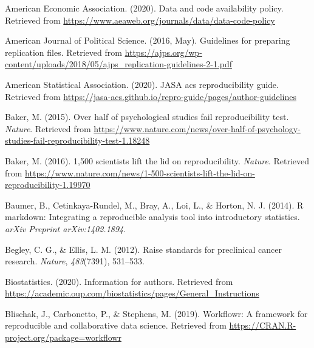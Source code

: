 \documentclass[12pt,twoside]{reedthesis}
\begin{document}

\noindent

\setlength{\parindent}{-0.20in}
\setlength{\leftskip}{0.20in}
\setlength{\parskip}{8pt}

\hypertarget{refs}{}
\leavevmode\hypertarget{ref-aee-policy}{}%
American Economic Association. (2020). Data and code availability policy. Retrieved from \url{https://www.aeaweb.org/journals/data/data-code-policy}

\leavevmode\hypertarget{ref-ajps-guidelines}{}%
American Journal of Political Science. (2016, May). Guidelines for preparing replication files. Retrieved from \url{https://ajps.org/wp-content/uploads/2018/05/ajps_replication-guidelines-2-1.pdf}

\leavevmode\hypertarget{ref-asa-guide}{}%
American Statistical Association. (2020). JASA acs reproducibility guide. Retrieved from \url{https://jasa-acs.github.io/repro-guide/pages/author-guidelines}

\leavevmode\hypertarget{ref-nature-psych}{}%
Baker, M. (2015). Over half of psychological studies fail reproducibility test. \emph{Nature}. Retrieved from \url{https://www.nature.com/news/over-half-of-psychology-studies-fail-reproducibility-test-1.18248}

\leavevmode\hypertarget{ref-nature-crisis}{}%
Baker, M. (2016). 1,500 scientists lift the lid on reproducibility. \emph{Nature}. Retrieved from \url{https://www.nature.com/news/1-500-scientists-lift-the-lid-on-reproducibility-1.19970}

\leavevmode\hypertarget{ref-baumer2014r}{}%
Baumer, B., Cetinkaya-Rundel, M., Bray, A., Loi, L., \& Horton, N. J. (2014). R markdown: Integrating a reproducible analysis tool into introductory statistics. \emph{arXiv Preprint arXiv:1402.1894}.

\leavevmode\hypertarget{ref-begley2012raise}{}%
Begley, C. G., \& Ellis, L. M. (2012). Raise standards for preclinical cancer research. \emph{Nature}, \emph{483}(7391), 531--533.

\leavevmode\hypertarget{ref-journal-biostats}{}%
Biostatistics. (2020). Information for authors. Retrieved from \url{https://academic.oup.com/biostatistics/pages/General_Instructions}

\leavevmode\hypertarget{ref-R-workflowr}{}%
Blischak, J., Carbonetto, P., \& Stephens, M. (2019). Workflowr: A framework for reproducible and collaborative data science. Retrieved from \url{https://CRAN.R-project.org/package=workflowr}
\end{document}
